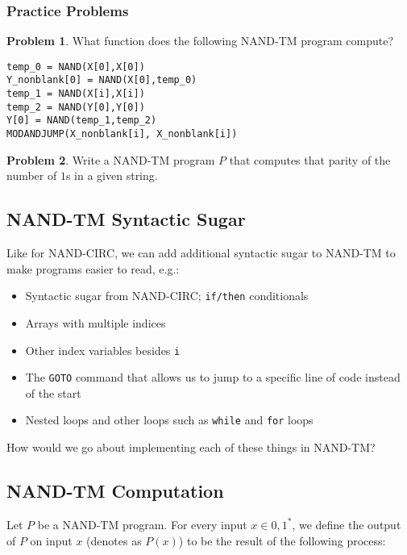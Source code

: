 \documentclass[11pt]{article}
\theoremstyle{definition}
\newtheorem{problem}{Problem}
\theoremstyle{remark}
\begin{document}
\subsubsection{Practice Problems}
\begin{problem} What function does the following NAND-TM program compute?

\begin{verbatim}
temp_0 = NAND(X[0],X[0])
Y_nonblank[0] = NAND(X[0],temp_0)
temp_1 = NAND(X[i],X[i])
temp_2 = NAND(Y[0],Y[0])
Y[0] = NAND(temp_1,temp_2)
MODANDJUMP(X_nonblank[i], X_nonblank[i])
\end{verbatim}
\end{problem}
\vspace{1cm}

\begin{problem}Write a NAND-TM program $P$ that computes that parity of the number of $1$s in a given string.
\end{problem}
\vspace{5cm}


\newpage
\subsection{NAND-TM Syntactic Sugar}
Like for NAND-CIRC, we can add additional syntactic sugar to NAND-TM to make programs easier to read, e.g.:
\begin{itemize}
    \item Syntactic sugar from NAND-CIRC; \texttt{if/then} conditionals
    \item Arrays with multiple indices
    \item Other index variables besides \texttt{i}
    \item The \texttt{GOTO} command that allows us to jump to a specific line of code instead of the start
    \item Nested loops and other loops such as \texttt{while} and \texttt{for} loops
\end{itemize}
How would we go about implementing each of these things in NAND-TM?

\subsection{NAND-TM Computation}
Let $P$ be a NAND-TM program. For every input $x\in {0,1}^*$, we define the output of $P$ on input $x$ (denotes as $P(x)$) to be the result of the following process:
\end{document}
